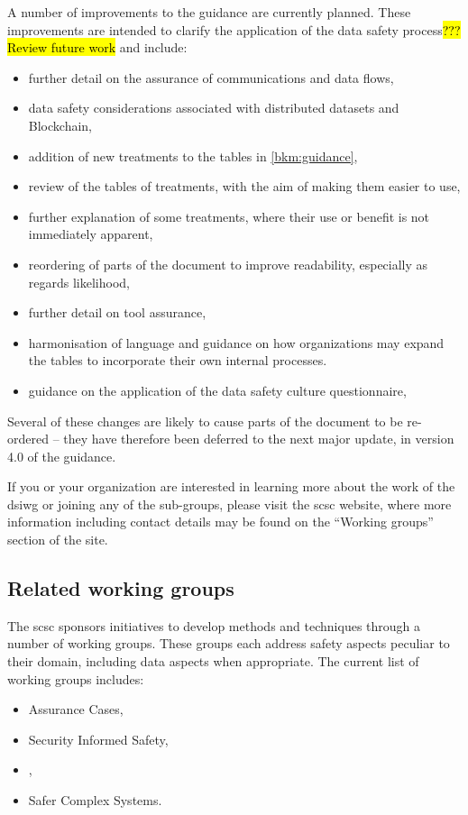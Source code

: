 A number of improvements to the guidance are currently planned.
These improvements are intended to clarify the application of the data safety process\hl{???Review future work}
and include:
\begin{itemize}
	\item further detail on the assurance of communications and data flows,
	\item data safety considerations associated with distributed \glspl{dataset} and Blockchain,
	\item addition of new \glspl{treatment} to the tables in \autoref{bkm:guidance},
	\item review of the tables of \glspl{treatment}, with the aim of making them easier to use,
	\item further explanation of some \glspl{treatment}, where their use or benefit is not immediately apparent, 
	\item reordering of parts of the document to improve readability, especially as regards likelihood, 
	\item further detail on tool assurance,
	\item harmonisation of language and guidance on how organizations may expand the tables to incorporate their own internal processes.
	\item guidance on the application of the data safety culture questionnaire,
\end{itemize}
Several of these changes are likely to
cause parts of the document to be re-ordered -- they have therefore been deferred to the next major update, in version 4.0 of the guidance.

If you or your organization are interested in learning more about the work of the \gls{dsiwg} or joining any of the sub-groups,
please visit the \gls{scsc} website, where more information including contact details may be found on the ``Working groups'' section of the site.
%
%
%
\subsection*{Related working groups}
The \gls{scsc} sponsors initiatives to develop methods and techniques through a number of working groups. These groups each address safety aspects peculiar to their domain, including data aspects when appropriate. The current list of working groups includes:
%
\begin{itemize}
	\item Assurance Cases,
	\item Security Informed Safety,
	\item {},
	\item Safer Complex Systems. 
\end{itemize}
%
%
\clearpage
%

